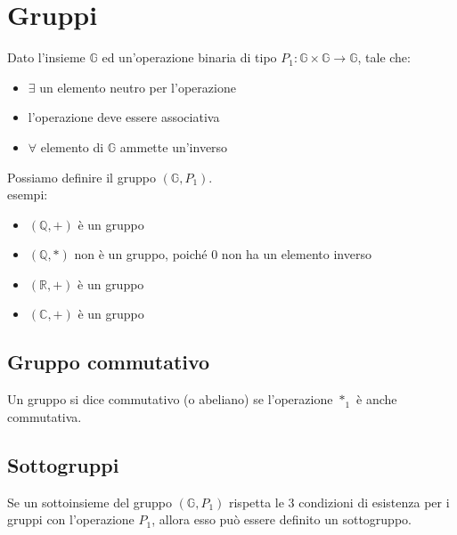 \documentclass{subfiles}
\begin{document}
\section{Gruppi}

Dato l'insieme $\mathbb{G}$ ed un'operazione binaria di tipo $P_1: \mathbb{G} \times \mathbb{G} \to \mathbb{G}$, tale che:

\begin{itemize}
    \item $\exists$  un elemento neutro per l'operazione
    \item l'operazione deve essere associativa
    \item $\forall$ elemento di $\mathbb{G}$ ammette un'inverso
\end{itemize}

\noindent
Possiamo definire il gruppo $(\mathbb{G}, P_1)$.\\

\noindent
esempi:

\begin{itemize}
    \item $(\mathbb{Q}, +)$ è un gruppo
    \item $(\mathbb{Q}, *)$ non è un gruppo, poiché $0$ non ha un elemento inverso
    \item $(\mathbb{R}, +)$ è un gruppo
    \item $(\mathbb{C}, +)$ è un gruppo
\end{itemize}

\subsection{Gruppo commutativo}

Un gruppo si dice commutativo (o abeliano) se l'operazione $*_1$ è anche commutativa.

\subsection{Sottogruppi}

Se un sottoinsieme del gruppo $(\mathbb{G}, P_1)$ rispetta le 3 condizioni di esistenza per i gruppi con l'operazione $P_1$, allora esso può essere definito un sottogruppo.
\end{document}
